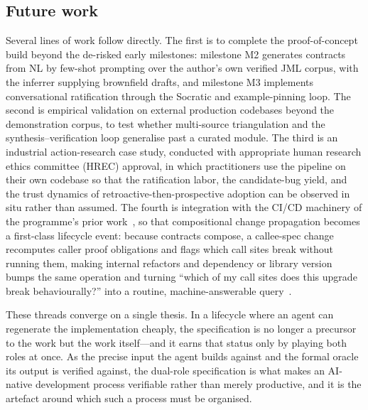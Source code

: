 \subsection{Future work}
\label{subsec:conclusion-future}

Several lines of work follow directly. The first is to complete the proof-of-concept build beyond the de-risked early milestones: milestone M2 generates contracts from NL by few-shot prompting over the author's own verified JML corpus, with the inferrer supplying brownfield drafts, and milestone M3 implements conversational ratification through the Socratic and example-pinning loop. The second is empirical validation on external production codebases beyond the demonstration corpus, to test whether multi-source triangulation and the synthesis--verification loop generalise past a curated module. The third is an industrial action-research case study, conducted with appropriate human research ethics committee (HREC) approval, in which practitioners use the pipeline on their own codebase so that the ratification labor, the candidate-bug yield, and the trust dynamics of retroactive-then-prospective adoption can be observed in situ rather than assumed. The fourth is integration with the CI/CD machinery of the programme's prior work~\cite{edmonds_article4}, so that compositional change propagation becomes a first-class lifecycle event: because contracts compose, a callee-spec change recomputes caller proof obligations and flags which call sites break without running them, making internal refactors and dependency or library version bumps the same operation and turning ``which of my call sites does this upgrade break behaviourally?'' into a routine, machine-answerable query~\cite{edmonds_article3,jayasuriya2024understanding,raemaekers2017semver}.

These threads converge on a single thesis. In a lifecycle where an agent can regenerate the implementation cheaply, the specification is no longer a precursor to the work but the work itself---and it earns that status only by playing both roles at once. As the precise input the agent builds against and the formal oracle its output is verified against, the dual-role specification is what makes an AI-native development process verifiable rather than merely productive, and it is the artefact around which such a process must be organised.
